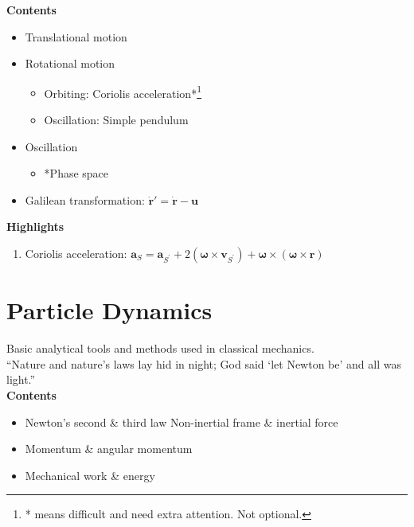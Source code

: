 \documentclass[11pt, a4paper, oneside]{book}
\numberwithin{equation}{section}%
\begin{document}
\textbf{Contents}
\begin{itemize}
	\item Translational motion
	\item Rotational motion
		\begin{itemize}
			\item Orbiting: Coriolis acceleration*\footnote{ * means difficult and need extra attention. Not optional.}
		\item Oscillation: Simple pendulum
		\end{itemize}
	\item Oscillation
		\begin{itemize}
			\item *Phase space
		\end{itemize}
	\item Galilean transformation: $\dot{\bm{r}}' = \dot{\bm{r}} - \bm{u}$
\end{itemize}

\textbf{Highlights}
\begin{enumerate}
	\item Coriolis acceleration: $\bm{a}_S = \bm{a}_{S^{'}} + 2 (\bm{\omega} \times \bm{v}_{S^{'}}) + \bm{\omega} \times (\bm{\omega}\times \bm{r})$
\end{enumerate}

\section{Particle Dynamics}

Basic analytical tools and methods used in classical mechanics.\\
``Nature and nature's laws lay hid in night;
God said `let Newton be' and all was light.''\\

\textbf{Contents}
\begin{itemize}
	\item Newton's second \& third law
		\subitem Non-inertial frame \& inertial force
	\item Momentum \& angular momentum
	\item Mechanical work \& energy 
\end{itemize}
\end{document}
